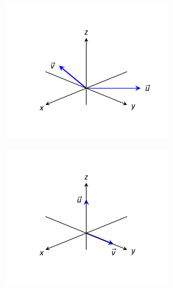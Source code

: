 \begin{Exercise}[
name={},
title={}, 
difficulty=0,
origin={\cite{GHC}}]
\begin{multicols}{2}
\begin{minipage}[m]{\linewidth}
\end{minipage}
\Question
\begin{minipage}[m]{\linewidth}
\centering
\includegraphics[width=\linewidth]{vector_geometry/introduction_to_vectors/figures/fig10_02_ex_14}
\end{minipage}
\Question
\begin{minipage}[m]{\linewidth}
\centering
\includegraphics[width=\linewidth]{vector_geometry/introduction_to_vectors/figures/fig10_02_ex_15}
\end{minipage}
\EndCurrentQuestion
\end{multicols}
\end{Exercise}
